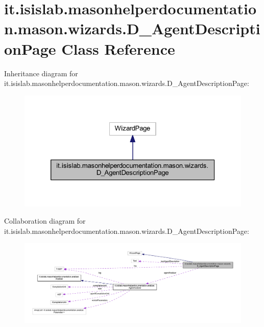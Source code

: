 \hypertarget{classit_1_1isislab_1_1masonhelperdocumentation_1_1mason_1_1wizards_1_1_d___agent_description_page}{\section{it.\-isislab.\-masonhelperdocumentation.\-mason.\-wizards.\-D\-\_\-\-Agent\-Description\-Page Class Reference}
\label{classit_1_1isislab_1_1masonhelperdocumentation_1_1mason_1_1wizards_1_1_d___agent_description_page}
}


Inheritance diagram for it.\-isislab.\-masonhelperdocumentation.\-mason.\-wizards.\-D\-\_\-\-Agent\-Description\-Page\-:
\nopagebreak
\begin{figure}[H]
\begin{center}
\leavevmode
\includegraphics[width=326pt]{classit_1_1isislab_1_1masonhelperdocumentation_1_1mason_1_1wizards_1_1_d___agent_description_page__inherit__graph}
\end{center}
\end{figure}


Collaboration diagram for it.\-isislab.\-masonhelperdocumentation.\-mason.\-wizards.\-D\-\_\-\-Agent\-Description\-Page\-:
\nopagebreak
\begin{figure}[H]
\begin{center}
\leavevmode
\includegraphics[width=350pt]{classit_1_1isislab_1_1masonhelperdocumentation_1_1mason_1_1wizards_1_1_d___agent_description_page__coll__graph}
\end{center}
\end{figure}
